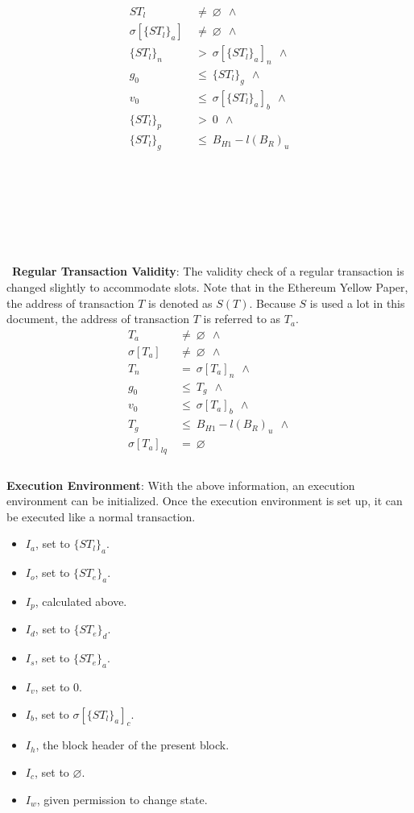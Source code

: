 \documentclass{article}
\begin{document}
\begin{align*}
    ST_l \ &\neq \ \varnothing \ \ \land \\
    \sigma[\{ST_l\}_a] \ &\neq \ \varnothing \ \ \land \\
    \{ST_l\}_n \ &> \ \sigma[\{ST_l\}_a]_n \ \ \land \\
    g_0 \ &\leq \ \{ST_l\}_g \ \ \land \\
    v_0 \ &\leq \ \sigma[\{ST_l\}_a]_b \ \ \land \\
    \{ST_l\}_p \ &> \ 0 \ \ \land \\
    \{ST_l\}_g \ &\leq \ B_{H1} - l(B_R)_u
\end{align*}
\\\\\\\\\\\\\\\
\textbf{Regular Transaction Validity}: The validity check of a regular transaction is changed slightly to accommodate slots. Note that in the Ethereum Yellow Paper, the address of transaction $T$ is denoted as $S(T)$. Because $S$ is used a lot in this document, the address of transaction $T$ is referred to as $T_a$.
\begin{align*}
    T_a \ &\neq \ \varnothing \ \ \land \\
    \sigma[T_a] \ &\neq \ \varnothing \ \ \land \\
    T_n \ &= \ \sigma[T_a]_n \ \ \land \\
    g_0 \ &\leq \ T_g \ \ \land \\
    v_0 \ &\leq \ \sigma[T_a]_b \ \ \land \\
    T_g \ &\leq \ B_{H1} - l(B_R)_u \ \ \land \\
    \sigma[T_a]_{lq} \ &= \ \varnothing \\ 
\end{align*}
\\
\textbf{Execution Environment}: With the above information, an execution environment can be initialized. Once the execution environment is set up, it can be executed like a normal transaction.
\begin{itemize}
    \item $I_a$, set to $\{ST_l\}_a$.
    \item $I_o$, set to $\{ST_e\}_a$.
    \item $I_p$, calculated above.
    \item $I_d$, set to $\{ST_e\}_d$.
    \item $I_s$, set to $\{ST_e\}_a$.
    \item $I_v$, set to $0$.
    \item $I_b$, set to $\sigma[\{ST_l\}_a]_c$.
    \item $I_h$, the block header of the present block.
    \item $I_c$, set to $\varnothing$.
    \item $I_w$, given permission to change state.
\end{itemize}
\end{document}
